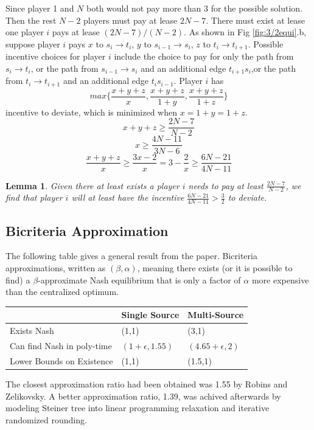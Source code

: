 \documentclass[11pt,psfig,times]{article}
\newtheorem{lemma}{Lemma}[section]
\begin{document}
	Since player 1 and $N$ both would not pay more than 3 for the possible solution. Then the rest $N-2$ players must pay at lease $2N-7$. There must exist at lease one player $i$ pays at lease $(2N-7)/(N-2)$. As shown in Fig \ref{fig:3/2equi}.b, suppose player $i$ pays $x$ to $s_i \rightarrow t_i$, $y$ to $s_{i-1} \rightarrow s_i$, $z$ to $t_i \rightarrow t_{i+1}$. Possible incentive choices for player $i$ include the choice to pay for only the path from $s_i \rightarrow t_i$, or the path from $s_{i-1} \rightarrow s_i$ and an additional edge $t_{i+1}s_i$,or the path from $t_i \rightarrow t_{i+1}$ and an additional edge $t_is_{i-1}$. Player $i$ has \[max\{\frac{x+y+z}{x},\frac{x+y+z}{1+y},\frac{x+y+z}{1+z}\}\] incentive to deviate, which is minimized when $x = 1+y =1+z$. 
		\[x+y+z \geq \frac{2N-7}{N-2}\]
		\[x \geq \frac{4N-11}{3N-6}\]
		\[\frac{x+y+z}{x} \geq \frac{3x-2}{x} = 3-\frac{2}{x} \geq \frac{6N-21}{4N-11} \]
	
		\begin{lemma}
			Given there at least exists a player $i$ needs to pay at least $\frac{2N-7}{N-2}$, we find that player $i$ will at least have the incentive $\frac{6N-21}{4N-11} > \frac{3}{2}$ to deviate.
		\end{lemma}
	
	\subsection{Bicriteria Approximation}
	The following table gives a general result from the paper. Bicriteria approximations, written as $(\beta,\alpha)$, meaning there exists (or it is possible to find) a $\beta$-approximate Nash equilibrium that is only a factor of $\alpha$ more expensive than the centralized optimum.
	\begin{center}
			\begin{tabular} { 
				| m{5cm} | m{3cm}| m{3cm} | }
			   \hline
				& Single Source & Multi-Source\\
			   \hline
			   Exists Nash  & (1,1)  &  (3,1)\\
			  \hline
			  Can find Nash in poly-time & $(1+\epsilon,1.55)$ & $(4.65+\epsilon,2)$\\
			  \hline
			  Lower Bounds on Existence & (1,1) & (1.5,1)\\
			  \hline
			  \end{tabular}
	\end{center}

	The closest approximation ratio had been obtained was 1.55 by  Robins and Zelikovsky. A better approximation ratio, 1.39, was achived afterwards by modeling Steiner tree into linear programming relaxation and iterative randomized rounding.
	
\end{document}
